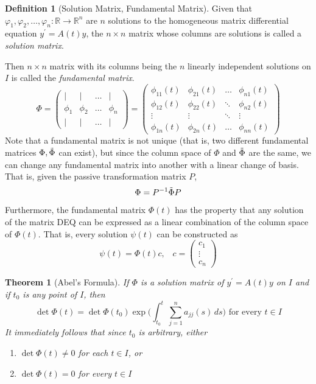 \documentclass{article}
\newtheorem{theorem}{Theorem}[section]
\theoremstyle{remark}
\theoremstyle{definition}
\newtheorem{definition}{Definition}[section]
\begin{document}
\begin{definition}[Solution Matrix, Fundamental Matrix]
Given that $\varphi_1, \varphi_2, \ldots, \varphi_n: \mathbb{R} \longrightarrow \mathbb{R}^n$ are $n$ solutions to the homogeneous matrix differential equation $y^\prime = A(t) y$, the $n \times n$ matrix whose columns are solutions is called a \textit{solution matrix}.

Then $n \times n$ matrix with its columns being the $n$ linearly independent solutions on $I$ is called the \textit{fundamental matrix}. 
\[\Phi = \begin{pmatrix}
| & | & \ldots & | \\
\phi_1 & \phi_2 & \ldots & \phi_n \\
| & | & \ldots & |
\end{pmatrix} = \begin{pmatrix}
\phi_{11}(t) & \phi_{21} (t) & \ldots & \phi_{n1} (t) \\
\phi_{12} (t) & \phi_{22} (t) & \ddots & \phi_{n2} (t) \\
\vdots & \vdots & \ddots & \vdots \\
\phi_{1n} (t) & \phi_{2n} (t) & \ldots & \phi_{nn} (t)
\end{pmatrix}\]
Note that a fundamental matrix is not unique (that is, two different fundamental matrices $\Phi, \Tilde{\Phi}$ can exist), but since the column space of $\Phi$ and $\Tilde{\Phi}$ are the same, we can change any fundamental matrix into another with a linear change of basis. That is, given the passive transformation matrix $P$, 
\[\Phi = P^{-1} \Tilde{\Phi} P\]
Furthermore, the fundamental matrix $\Phi (t)$ has the property that any solution of the matrix DEQ can be expressed as a linear combination of the column space of $\Phi(t)$. That is, every solution $\psi (t)$ can be constructed as
\[\psi (t) = \Phi (t) c, \;\;\; c = \begin{pmatrix} 
c_1 \\ \vdots \\ c_n \end{pmatrix} \]
\end{definition}

\begin{theorem}[Abel's Formula]
If $\Phi$ is a solution matrix of $y^\prime = A(t) y$ on $I$ and if $t_0$ is any point of $I$, then 
\[\det{\Phi(t)} = \det{\Phi(t_0)} \exp\bigg( \int_{t_0}^t \sum_{j=1}^n a_{jj} (s) \, ds\bigg) \text{ for every } t \in I\]
It immediately follows that since $t_0$ is arbitrary, either 
\begin{enumerate}
    \item $\det{\Phi(t)} \neq 0$ for each $t \in I$, or 
    \item $\det{\Phi(t)} = 0$ for every $t \in I$ 
\end{enumerate}
\end{theorem}
\end{document}
